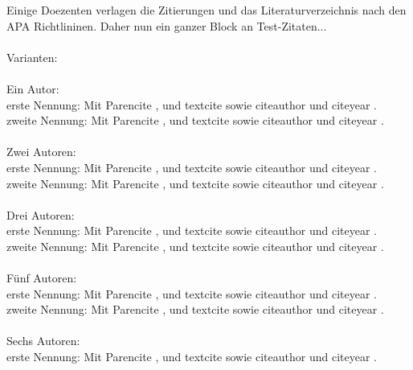 \documentclass[12pt,oneside,titlepage]{scrartcl}
\begin{document}
Einige Doezenten verlagen die Zitierungen und das Literaturverzeichnis nach den APA Richtlininen. Daher nun ein ganzer Block an Test-Zitaten...\\
\\
Varianten:\\
\\
Ein Autor: \\
erste Nennung: Mit Parencite \parencite{Beckert1}, und textcite \textcite{Beckert1} sowie citeauthor \citeauthor{Beckert1} und citeyear \citeyear{Beckert1}. \\
zweite Nennung: Mit Parencite \parencite{Beckert1}, und textcite \textcite{Beckert1} sowie citeauthor \citeauthor{Beckert1} und citeyear \citeyear{Beckert1}. \\
\\
Zwei Autoren: \\
erste Nennung: Mit Parencite \parencite{Tanenbaum2}, und textcite \textcite{Tanenbaum2} sowie citeauthor \citeauthor{Tanenbaum2} und citeyear \citeyear{Tanenbaum2}. \\
zweite Nennung:  Mit Parencite \parencite{Tanenbaum2}, und textcite \textcite{Tanenbaum2} sowie citeauthor \citeauthor{Tanenbaum2} und citeyear \citeyear{Tanenbaum2}. \\
\\
Drei  Autoren: \\
erste Nennung: Mit Parencite \parencite{Beckert3}, und textcite \textcite{Beckert3} sowie citeauthor \citeauthor{Beckert3} und citeyear \citeyear{Beckert3}. \\
zweite Nennung: Mit Parencite \parencite{Beckert3}, und textcite \textcite{Beckert3} sowie citeauthor \citeauthor{Beckert3} und citeyear \citeyear{Beckert3}. \\
\\
Fünf  Autoren: \\
erste Nennung: Mit Parencite \parencite{Mueller5}, und textcite \textcite{Mueller5} sowie citeauthor \citeauthor{Mueller5} und citeyear \citeyear{Mueller5}. \\
zweite Nennung: Mit Parencite \parencite{Mueller5}, und textcite \textcite{Mueller5} sowie citeauthor \citeauthor{Mueller5} und citeyear \citeyear{Mueller5}. \\
\\
Sechs  Autoren: \\
erste Nennung: Mit Parencite \parencite{Schmidt6}, und textcite \textcite{Schmidt6} sowie citeauthor \citeauthor{Schmidt6} und citeyear \citeyear{Schmidt6}. \\
\end{document}
